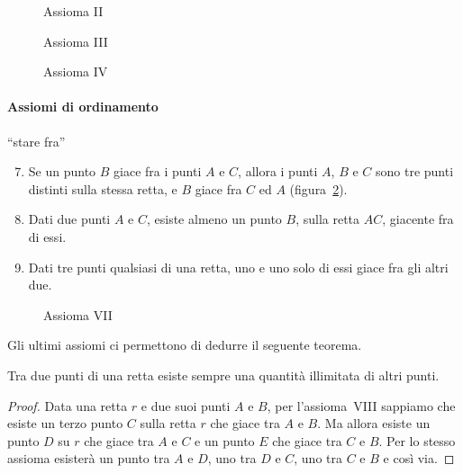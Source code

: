 \begin{inaccessibleblock}
 \begin{figure}[bth]
 \begin{minipage}[b]{.32\textwidth}
 \centering
 
 \caption{Assioma II}\label{fig:1.3}
 \end{minipage}
 \begin{minipage}[b]{.32\textwidth}
 \centering
 
 \caption{Assioma III}\label{fig:1.4}
 \end{minipage}
 \begin{minipage}[b]{.32\textwidth}
 \centering
 
 \caption{Assioma IV}\label{fig:1.5}
 \end{minipage}
\end{figure}
\end{inaccessibleblock}

\paragraph{Assiomi di ordinamento} ``stare fra''
\begin{enumerate}[label=\Roman{*}.]
\setcounter{enumi}{6}
\item Se un punto $B$ giace fra i punti $A$ e $C$, allora i punti 
$A$, $B$ e $C$ sono tre punti distinti sulla stessa retta, e $B$ 
giace fra $C$ ed $A$ (figura~\ref{fig:1.6}).
\item Dati due punti $A$ e $C$, esiste almeno un punto $B$, sulla 
retta $AC$, giacente fra di essi.
\item Dati tre punti qualsiasi di una retta, uno e uno solo di essi 
giace fra gli altri due.
\end{enumerate}

\begin{inaccessibleblock}
 \begin{figure}[htb]
 \centering
 
 \caption{Assioma VII}\label{fig:1.6}
\end{figure}
\end{inaccessibleblock}

Gli ultimi assiomi ci permettono di dedurre il seguente teorema.
\begin{teorema}
Tra due punti di una retta esiste sempre una quantità illimitata di 
altri punti.
\end{teorema}

\begin{proof}
Data una retta $r$ e due suoi punti $A$ e $B$, per l'assioma~VIII 
sappiamo che esiste un terzo punto $C$ sulla retta $r$ che giace tra 
$A$ e $B$. Ma allora esiste un punto $D$ su $r$ che giace tra $A$ e 
$C$ e un punto $E$ che giace tra $C$ e $B$. Per lo stesso assioma 
esisterà un punto tra $A$ e $D$, uno tra $D$ e $C$, uno tra $C$ e $B$ 
e così via.
\end{proof}

